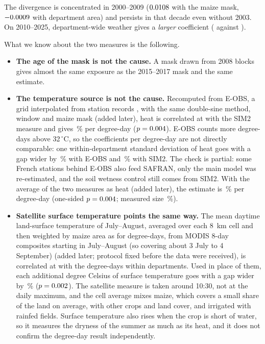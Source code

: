 The divergence is concentrated in 2000--2009 ($0.0108$ with the maize mask, $-0.0009$ with department area) and persists in that decade even without 2003. On 2010--2025, department-wide weather gives a \emph{larger} coefficient (\AreaRecent{} against \MaskRecent).

What we know about the two measures is the following.
\begin{itemize}
  \item \textbf{The age of the mask is not the cause.} A mask drawn from 2008 blocks gives almost the same exposure as the 2015--2017 mask and the same estimate.
  \item \textbf{The temperature source is not the cause.} Recomputed from E-OBS, a grid interpolated from station records \parencite{cornes2018}, with the same double-sine method, window and maize mask (added later), heat is correlated at \EobsCorr{} with the SIM2 measure and gives \EobsPct\,\% per degree-day ($p = 0.004$). E-OBS counts more degree-days above 32\,$^{\circ}$C, so the coefficients per degree-day are not directly comparable: one within-department standard deviation of heat goes with a gap wider by \EobsSdEffect\,\% with E-OBS and \SimSdEffect\,\% with SIM2. The check is partial: some French stations behind E-OBS also feed SAFRAN, only the main model was re-estimated, and the soil wetness control still comes from SIM2. With the average of the two measures as heat (added later), the estimate is \AvgHeatPct\,\% per degree-day (one-sided $p = 0.004$; measured size \AvgHeatSize\,\%).
  \item \textbf{Satellite surface temperature points the same way.} The mean daytime land-surface temperature of July--August, averaged over each 8~km cell and then weighted by maize area as for degree-days, from MODIS 8-day composites starting in July--August (so covering about 3 July to 4 September) \parencite{wan2021} (added later; protocol fixed before the data were received), is correlated at \LstCorr{} with the degree-days within departments. Used in place of them, each additional degree Celsius of surface temperature goes with a gap wider by \LstPct\,\% ($p = 0.002$). The satellite measure is taken around 10:30, not at the daily maximum, and the cell average mixes maize, which covers a small share of the land on average, with other crops and land cover, and irrigated with rainfed fields. Surface temperature also rises when the crop is short of water, so it measures the dryness of the summer as much as its heat, and it does not confirm the degree-day result independently.

\end{itemize}
